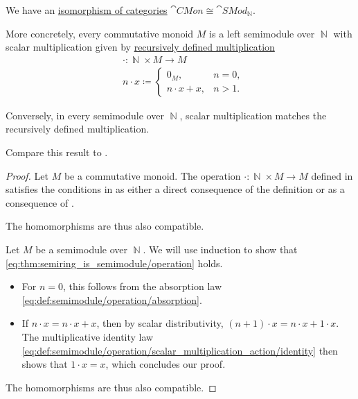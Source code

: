\begin{proposition}\label{thm:commutative_monoid_is_semimodule}
  We have an \hyperref[rem:category_similarity/isomorphism]{isomorphism of categories} \( \hyperref[def:monoid/category]{\cat{CMon}} \cong \hyperref[def:semimodule/category]{\cat{SMod}_\BbbN} \).

  More concretely, every commutative monoid \( M \) is a left semimodule over \( \BbbN \) with scalar multiplication given by \hyperref[rem:additive_magma/multiplication]{recursively defined multiplication}
  \begin{equation}\label{eq:thm:commutative_monoid_is_semimodule/operation}
    \begin{aligned}
      &\cdot: \BbbN \times M \to M \\
      &n \cdot x \coloneqq \begin{cases}
        0_M,           &n = 0, \\
        n \cdot x + x, &n > 1.
      \end{cases}
    \end{aligned}
  \end{equation}

  Conversely, in every semimodule over \( \BbbN \), scalar multiplication matches the recursively defined multiplication.

  Compare this result to .
\end{proposition}
\begin{proof}
  \SufficiencySubProof Let \( M \) be a commutative monoid. The operation \( \cdot: \BbbN \times M \to M \) defined in  satisfies the conditions in  as either a direct consequence of the definition or as a consequence of .

  The homomorphisms are thus also compatible.

  \NecessitySubProof Let \( M \) be a semimodule over \( \BbbN \). We will use induction to show that \eqref{eq:thm:semiring_is_semimodule/operation} holds.
  \begin{itemize}
    \item For \( n = 0 \), this follows from the absorption law \eqref{eq:def:semimodule/operation/absorption}.
    \item If \( n \cdot x = n \cdot x + x \), then by scalar distributivity, \( (n + 1) \cdot x = n \cdot x + 1 \cdot x \). The multiplicative identity law \eqref{eq:def:semimodule/operation/scalar_multiplication_action/identity} then shows that \( 1 \cdot x = x \), which concludes our proof.
  \end{itemize}

  The homomorphisms are thus also compatible.
\end{proof}

